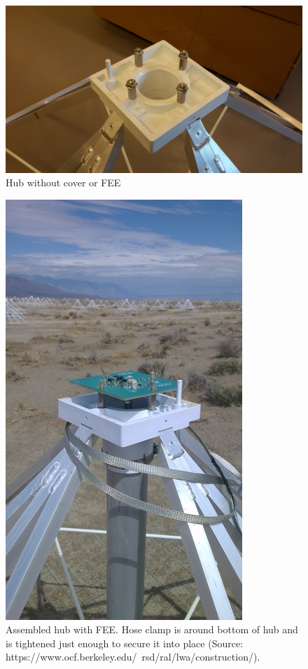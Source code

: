 \documentclass[12pt]{article}
\begin{document}
\begin{enumerate}
\begin{enumerate}
\begin{figure}[!h]
	\center
	\includegraphics[width=\linewidth]{plots/20141125_112425.jpg}
	\caption{Hub without cover or FEE \label{HubCompleteSansCover}}
\end{figure}

\begin{figure}
	\center
	\includegraphics[width=0.7\linewidth]{plots/IMAG0068.jpg}
	\caption{Assembled hub with FEE. Hose clamp is around bottom of hub and is tightened just enough to secure it into place (Source: https://www.ocf.berkeley.edu/~rsd/ral/lwa/construction/). \label{ClampedHub}}
\end{figure}


\end{enumerate}
\end{enumerate}
\end{document}

